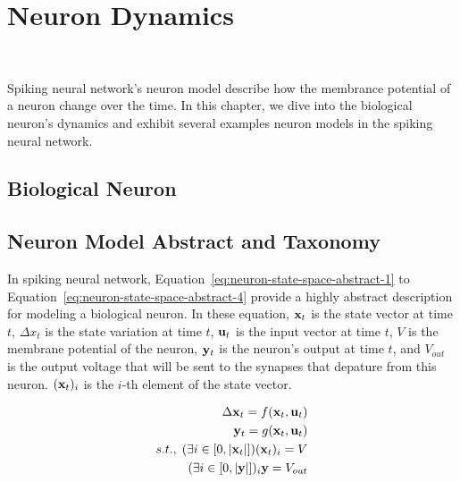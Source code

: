 

\chapter{Neuron Dynamics}\

Spiking neural network's neuron model describe how the membrance potential of a neuron change over the time.
In this chapter, we dive into the biological neuron's dynamics and exhibit several examples neuron models in the 
spiking neural network. 


\section{Biological Neuron}


\section{Neuron Model Abstract and Taxonomy}
In spiking neural network, Equation~\ref{eq:neuron-state-space-abstract-1} to
Equation~\ref{eq:neuron-state-space-abstract-4} provide a highly abstract description for
 modeling a biological neuron.
In these equation, $\bold x_t$ is the state vector at time $t$, $\Delta x_t$ is the state variation at time 
$t$, $\bold u_t$ is the input vector at time $t$, $V$ is the membrane potential of the neuron, 
$\bold y_t$ is the neuron's output at time $t$, 
and $V_{out}$ is the output voltage that will be sent to the synapses that depature from this neuron. 
$(\bold x_{t})_{i}$ is the $i$-th element of the state vector.

\begin{align}
    \Delta \bold x_t = f(\bold x_t, \bold u_t) \label{eq:neuron-state-space-abstract-1} \\
    \bold y_t = g(\bold x_t, \bold u_t) \label{eq:neuron-state-space-abstract-2} \\
    s.t.,\; (\exists i \in [0, |\bold x_t|])(\bold x_{t})_{i} = V \label{eq:neuron-state-space-abstract-3}\\
            (\exists i \in [0, |\bold y|])_i\bold y = V_{out} \label{eq:neuron-state-space-abstract-4}
\end{align}

